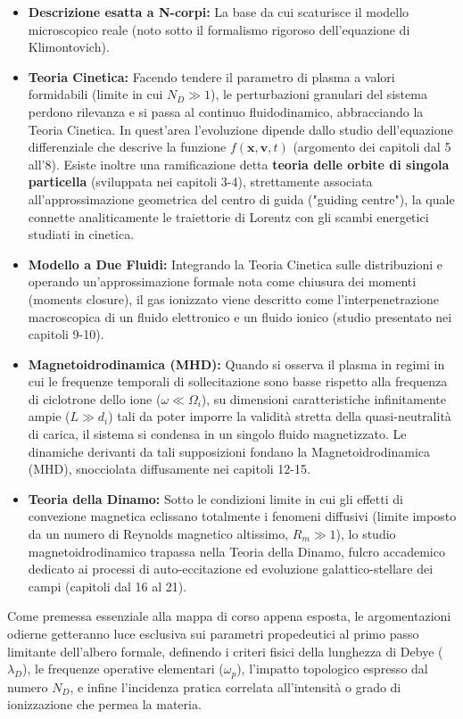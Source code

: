 \begin{itemize}
\item \textbf{Descrizione esatta a N-corpi:} La base da cui scaturisce il modello microscopico reale (noto sotto il formalismo rigoroso dell'equazione di Klimontovich).
\item \textbf{Teoria Cinetica:} Facendo tendere il parametro di plasma a valori formidabili (limite in cui $N_D \gg 1$), le perturbazioni granulari del sistema perdono rilevanza e si passa al continuo fluidodinamico, abbracciando la Teoria Cinetica. In quest'area l'evoluzione dipende dallo studio dell'equazione differenziale che descrive la funzione $f(\mathbf{x}, \mathbf{v}, t)$ (argomento dei capitoli dal 5 all'8). Esiste inoltre una ramificazione detta \textbf{teoria delle orbite di singola particella} (sviluppata nei capitoli 3-4), strettamente associata all'approssimazione geometrica del centro di guida ("guiding centre"), la quale connette analiticamente le traiettorie di Lorentz con gli scambi energetici studiati in cinetica.
\item \textbf{Modello a Due Fluidi:} Integrando la Teoria Cinetica sulle distribuzioni e operando un'approssimazione formale nota come chiusura dei momenti (moments closure), il gas ionizzato viene descritto come l'interpenetrazione macroscopica di un fluido elettronico e un fluido ionico (studio presentato nei capitoli 9-10).
\item \textbf{Magnetoidrodinamica (MHD):} Quando si osserva il plasma in regimi in cui le frequenze temporali di sollecitazione sono basse rispetto alla frequenza di ciclotrone dello ione ($\omega \ll \Omega_i$), su dimensioni caratteristiche infinitamente ampie ($L \gg d_i$) tali da poter imporre la validità stretta della quasi-neutralità di carica, il sistema si condensa in un singolo fluido magnetizzato. Le dinamiche derivanti da tali supposizioni fondano la Magnetoidrodinamica (MHD), snocciolata diffusamente nei capitoli 12-15.
\item \textbf{Teoria della Dinamo:} Sotto le condizioni limite in cui gli effetti di convezione magnetica eclissano totalmente i fenomeni diffusivi (limite imposto da un numero di Reynolds magnetico altissimo, $R_m \gg 1$), lo studio magnetoidrodinamico trapassa nella Teoria della Dinamo, fulcro accademico dedicato ai processi di auto-eccitazione ed evoluzione galattico-stellare dei campi (capitoli dal 16 al 21).
\end{itemize}
Come premessa essenziale alla mappa di corso appena esposta, le argomentazioni odierne getteranno luce esclusiva sui parametri propedeutici al primo passo limitante dell'albero formale, definendo i criteri fisici della lunghezza di Debye ($\lambda_D$), le frequenze operative elementari ($\omega_p$), l'impatto topologico espresso dal numero $N_D$, e infine l'incidenza pratica correlata all'intensità o grado di ionizzazione che permea la materia.

